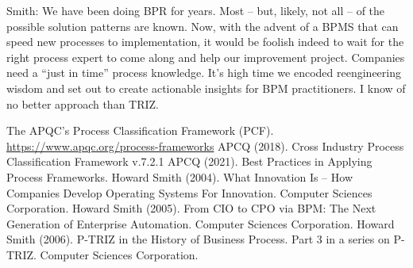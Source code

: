 \documentclass[11pt,a4paper]{article}
\begin{document}
Smith: We have been doing BPR for years. Most – but, likely, not all – of the
possible solution patterns are known. Now, with the advent of a BPMS that can
speed new processes to implementation, it would be foolish indeed to wait for
the right process expert to come along and help our improvement project.
Companies need a “just in time” process knowledge. It’s high time we encoded
reengineering wisdom and set out to create actionable insights for BPM
practitioners. I know of no better approach than TRIZ.

\begin{thebibliography}{xxx}
 The APQC’s Process Classification Framework (PCF).\\
  \url{https://www.apqc.org/process-frameworks}
 APCQ (2018). Cross Industry Process Classification Framework
  v.7.2.1
 APCQ (2021). Best Practices in Applying Process Frameworks.
 Howard Smith (2004). What Innovation Is – How Companies
  Develop Operating Systems For Innovation. Computer Sciences Corporation. 
 Howard Smith (2005). From CIO to CPO via BPM: The Next
  Generation of Enterprise Automation. Computer Sciences Corporation.
 Howard Smith (2006). P-TRIZ in the History of Business
  Process. Part 3 in a series on P-TRIZ.  Computer Sciences Corporation.
\end{thebibliography}
\end{document}
